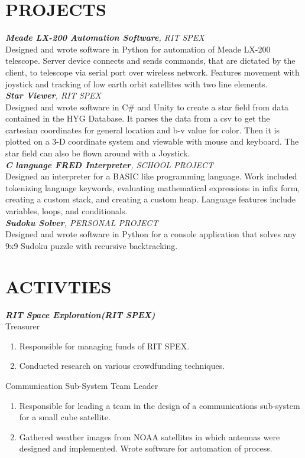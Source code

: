 \documentclass[line, margin]{res}
\begin{document}
\begin{resume}
\section{PROJECTS}
\textit{\textbf{Meade LX-200 Automation Software}, RIT SPEX}\\
Designed and wrote software in Python for automation of Meade LX-200 telescope. Server device connects and sends commands, that are dictated by the client, to telescope via serial port over wireless network. Features movement with joystick and tracking of low earth orbit satellites with two line elements.
\\ [10pt]
\textit{\textbf{Star Viewer}, RIT SPEX}\\
Designed and wrote software in C\# and Unity to create a star field from data contained in the HYG Database. It parses the data from a csv to get the cartesian coordinates for general location and b-v value for color. Then it is plotted on a 3-D coordinate system and viewable with mouse and keyboard. The star field can also be flown around with a Joystick.
\\ [10pt]
\textit{\textbf{C language FRED Interpreter}, SCHOOL PROJECT}\\
Designed an interpreter for a BASIC like programming language. Work included tokenizing language
keywords, evaluating mathematical expressions in infix form, creating a custom stack, and creating a custom heap. Language features include variables, loops, and conditionals.
\\ [10pt]
\textit{\textbf{Sudoku Solver}, PERSONAL PROJECT}\\
Designed and wrote software in Python for a console application that solves any 9x9 Sudoku puzzle with recursive backtracking.


\section{ACTIVTIES}
\textit{\textbf{RIT Space Exploration(RIT SPEX)}}\\
Treasurer
      \begin{enumerate}[series=MyList, label=\textbullet]
        \item Responsible for managing funds of RIT SPEX.
        \item Conducted research on various crowdfunding techniques.
      \end{enumerate}
      
Communication Sub-System Team Leader
      \begin{enumerate}[series=MyList, label=\textbullet]
        \item Responsible for leading a team in the design of a communications sub-system for a small cube satellite.
        \item Gathered weather images from NOAA satellites in which antennas were designed and implemented. Wrote software for automation of process.
      \end{enumerate}
      


\end{resume}
\end{document}
